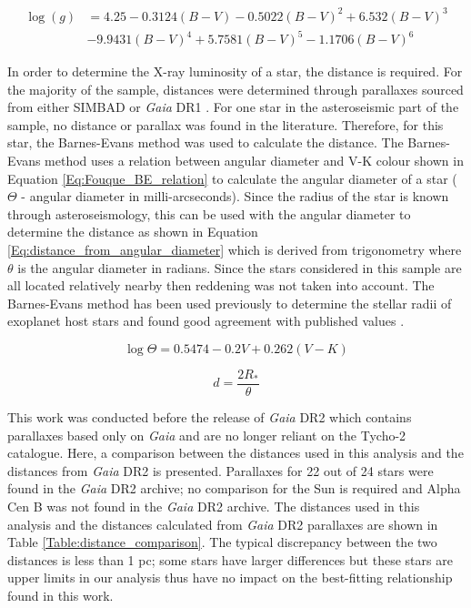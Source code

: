 \begin{equation}
    \begin{aligned}
    \log(g) & = 4.25 - 0.3124(B-V) - 0.5022(B-V)^{2} + 6.532(B-V)^{3} \\
    &- 9.9431(B-V)^{4} + 5.7581(B-V)^{5} - 1.1706(B-V)^{6}
    \label{Eq:Gray_2005}
    \end{aligned}
\end{equation}

In order to determine the X-ray luminosity of a star, the distance is required. For the majority of the sample, distances were determined through parallaxes sourced from either SIMBAD \citep{Wenger_etal_2000} or \textit{Gaia} DR1 \citep{Gaia_Collaboration_2016_DR1}. For one star in the asteroseismic part of the sample, no distance or parallax was found in the literature. Therefore, for this star, the Barnes-Evans method was used to calculate the distance. The Barnes-Evans method uses a relation between angular diameter and V-K colour \citep{Fouque_Gieren_1997} shown in Equation \ref{Eq:Fouque_BE_relation} to calculate the angular diameter of a star ($\Theta$ - angular diameter in milli-arcseconds). Since the radius of the star is known through asteroseismology, this can be used with the angular diameter to determine the distance as shown in Equation \ref{Eq:distance_from_angular_diameter} which is derived from trigonometry where $\theta$ is the angular diameter in radians. Since the stars considered in this sample are all located relatively nearby then reddening was not taken into account. The Barnes-Evans method has been used previously to determine the stellar radii of exoplanet host stars and found good agreement with published values \citep{Watson_etal_2010}.

\begin{equation}
    \log\Theta = 0.5474 - 0.2V + 0.262(V-K)
    \label{Eq:Fouque_BE_relation}
\end{equation}

\begin{equation}
    d = \frac{2R_{*}}{\theta}
    \label{Eq:distance_from_angular_diameter}
\end{equation}

This work was conducted before the release of \textit{Gaia} DR2 \citep{Gaia_collaboration_2018} which contains parallaxes based only on \textit{Gaia} and are no longer reliant on the Tycho-2 catalogue. Here, a comparison between the distances used in this analysis and the distances from \textit{Gaia} DR2 is presented. Parallaxes for 22 out of 24 stars were found in the \textit{Gaia} DR2 archive; no comparison for the Sun is required and Alpha Cen B was not found in the \textit{Gaia} DR2 archive. The distances used in this analysis and the distances calculated from \textit{Gaia} DR2 parallaxes are shown in Table \ref{Table:distance_comparison}. The typical discrepancy between the two distances is less than 1 pc; some stars have larger differences but these stars are upper limits in our analysis thus have no impact on the best-fitting relationship found in this work.

